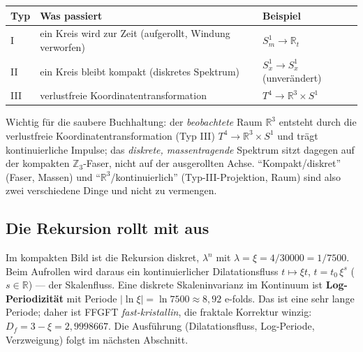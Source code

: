 \begin{center}
\begin{tabular}{@{}p{1.5cm} p{6.2cm} p{4.3cm}@{}}
\toprule
Typ & Was passiert & Beispiel \\
\midrule
I & ein Kreis wird zur Zeit (aufgerollt, Windung verworfen) & $S^1_m\to\mathbb{R}_t$ \\
II & ein Kreis bleibt kompakt (diskretes Spektrum) & $S^1_x\to S^1_x$ (unver\"andert) \\
III & verlustfreie Koordinatentransformation & $T^4\to\mathbb{R}^3\times S^1$ \\
\bottomrule
\end{tabular}
\end{center}

Wichtig f\"ur die saubere Buchhaltung: der \emph{beobachtete} Raum $\mathbb{R}^3$ entsteht durch die
verlustfreie Koordinatentransformation (Typ III) $T^4\to\mathbb{R}^3\times S^1$ und tr\"agt
kontinuierliche Impulse; das \emph{diskrete, massentragende} Spektrum sitzt dagegen auf der kompakten
$\mathbb{Z}_3$-Faser, nicht auf der ausgerollten Achse. \enquote{Kompakt/diskret} (Faser, Massen) und
\enquote{$\mathbb{R}^3$/kontinuierlich} (Typ-III-Projektion, Raum) sind also zwei verschiedene Dinge
und nicht zu vermengen.

\subsection{Die Rekursion rollt mit aus}
Im kompakten Bild ist die Rekursion diskret, $\lambda^n$ mit $\lambda=\xi=4/30000=1/7500$. Beim
Aufrollen wird daraus ein kontinuierlicher Dilatationsfluss $t\mapsto\xi t$, $t=t_0\,\xi^s$
($s\in\mathbb{R}$) --- der Skalenfluss. Eine diskrete Skaleninvarianz im Kontinuum ist
\textbf{Log-Periodizit\"at} mit Periode $|\ln\xi|=\ln 7500\approx 8{,}92$ e-folds. Das ist eine sehr
lange Periode; daher ist FFGFT \emph{fast-kristallin}, die fraktale Korrektur winzig:
$D_f=3-\xi=2{,}9998667$. Die Ausf\"uhrung (Dilatationsfluss, Log-Periode, Verzweigung) folgt im
n\"achsten Abschnitt.

